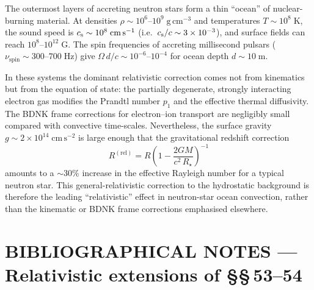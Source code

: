 The outermost layers of accreting neutron stars form a thin ``ocean'' of
nuclear-burning material.  At densities $\rho\sim 10^{6}$--$10^{9}\;\mathrm{g\,cm^{-3}}$
and temperatures $T\sim 10^{8}\;\mathrm{K}$, the sound speed is
$c_{\mathrm{s}}\sim 10^{8}\;\mathrm{cm\,s^{-1}}$ (i.e.\ $c_{\mathrm{s}}/c\sim 3\times10^{-3}$),
and surface fields can reach $10^{8}$--$10^{12}\;\mathrm{G}$.
The spin frequencies of accreting millisecond pulsars
($\nu_{\mathrm{spin}}\sim 300$--$700\;\mathrm{Hz}$)
give $\Omega\,d/c\sim 10^{-6}$--$10^{-4}$ for ocean depth $d\sim 10\;\mathrm{m}$.

In these systems the dominant relativistic correction comes not from kinematics
but from the equation of state: the partially degenerate, strongly
interacting electron gas modifies the Prandtl number $p_1$ and the effective
thermal diffusivity.  The BDNK frame corrections for
electron--ion transport are negligibly small compared with convective
time-scales.  Nevertheless, the surface
gravity $g\sim 2\times10^{14}\;\mathrm{cm\,s^{-2}}$ is large enough that
the gravitational redshift correction
\begin{equation}
  R^{(\mathrm{rel})} = R\!\left(1 - \frac{2GM}{c^{2}\,R_{\star}}\right)^{-1}
  \label{eq:rel54-redshift-R}
\end{equation}
amounts to a $\sim 30\%$ increase in the effective Rayleigh number for
a typical neutron star.  This general-relativistic correction to the
hydrostatic background is therefore the leading ``relativistic'' effect
in neutron-star ocean convection, rather than the kinematic or
BDNK frame corrections emphasised elsewhere.


\section*{BIBLIOGRAPHICAL NOTES --- Relativistic extensions of \S\S\,53--54}

